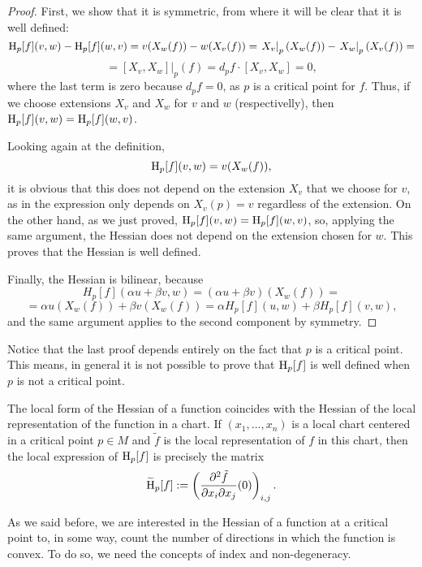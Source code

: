 \begin{proof}
	First, we show that it is symmetric, from where it will be clear that it is well defined:
\[\operatorname H_p[f](v,w) - \operatorname H_p[f](w,v) = v(X_w(f)) - w(X_v(f)) = \left. X_v \right|_p(X_w(f)) - \left. X_w \right|_p (X_v(f)) = \]
\[= \left. [X_v,X_w] \right|_p(f) = d_p f \cdot [X_v,X_w] = 0 ,\]
where the last term is zero because $d_p f = 0$, as $p$ is a critical point for $f$. Thus, if we choose extensions $X_v$ and $X_w$ for $v$ and $w$ (respectivelly), then $\operatorname H_p[f](v,w) = \operatorname H_p[f](w,v)$.

Looking again at the definition,
\[\operatorname H_p[f](v,w) = v(X_w(f)),\]
it is obvious that this does not depend on the extension $X_v$ that we choose for $v$, as in the expression only depends on $X_v(p) = v$ regardless of the extension. On the other hand, as we just proved, $\operatorname H_p[f](v,w) = \operatorname H_p[f](w,v)$, so, applying the same argument, the Hessian does not depend on the extension chosen for $w$. This proves that the Hessian is well defined.

Finally, the Hessian is bilinear, because
\[H_p[f](\alpha u + \beta v, w) = (\alpha u + \beta v)(X_w(f)) = \]
\[= \alpha u(X_w(f)) + \beta v(X_w(f)) = \alpha H_p[f](u,w) + \beta H_p[f](v,w) ,\]
and the same argument applies to the second component by symmetry.
\end{proof}

Notice that the last proof depends entirely on the fact that $p$ is a critical point. This means, in general it is not possible to prove that $\operatorname H_p[f]$ is well defined when $p$ is not a critical point.

\begin{rmrk}
	The local form of the Hessian of a function coincides with the Hessian of the local representation of the function in a chart. If $(x_1,...,x_n)$ is a local chart centered in a critical point $p \in M$ and $\tilde{f}$ is the local representation of $f$ in this chart, then the local expression of $\operatorname H_p[f]$ is precisely the matrix
\[\widetilde{\operatorname H}_p[f] := \left( \frac{\partial^2 \tilde{f}}{\partial x_i \partial x_j}(0) \right)_{i,j} .\]
\end{rmrk}

As we said before, we are interested in the Hessian of a function at a critical point to, in some way, count the number of directions in which the function is convex. To do so, we need the concepts of index and non-degeneracy.

